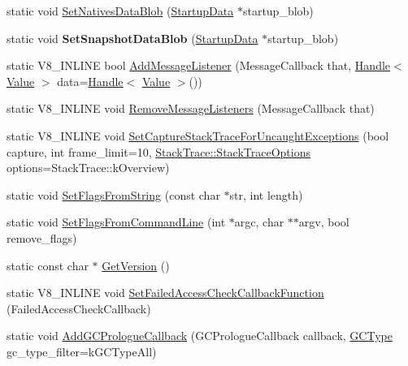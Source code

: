 \begin{DoxyCompactItemize}
\item 
static void \hyperlink{classv8_1_1V8_ae6a0f605e072e9e27e3666559d5c351f}{Set\+Natives\+Data\+Blob} (\hyperlink{classv8_1_1StartupData}{Startup\+Data} $\ast$startup\+\_\+blob)
\item 
\hypertarget{classv8_1_1V8_a231b3cd8e5578497ee36210c0411f14c}{}static void {\bfseries Set\+Snapshot\+Data\+Blob} (\hyperlink{classv8_1_1StartupData}{Startup\+Data} $\ast$startup\+\_\+blob)\label{classv8_1_1V8_a231b3cd8e5578497ee36210c0411f14c}

\item 
static V8\+\_\+\+I\+N\+L\+I\+N\+E bool \hyperlink{classv8_1_1V8_a4e8ca19596400bd4df6a345f66daf937}{Add\+Message\+Listener} (Message\+Callback that, \hyperlink{classv8_1_1Handle}{Handle}$<$ \hyperlink{classv8_1_1Value}{Value} $>$ data=\hyperlink{classv8_1_1Handle}{Handle}$<$ \hyperlink{classv8_1_1Value}{Value} $>$())
\item 
static V8\+\_\+\+I\+N\+L\+I\+N\+E void \hyperlink{classv8_1_1V8_a103099e00d03c714261e00d75f0d745a}{Remove\+Message\+Listeners} (Message\+Callback that)
\item 
static V8\+\_\+\+I\+N\+L\+I\+N\+E void \hyperlink{classv8_1_1V8_a6ed3c6cd32b8d225013445b145381d34}{Set\+Capture\+Stack\+Trace\+For\+Uncaught\+Exceptions} (bool capture, int frame\+\_\+limit=10, \hyperlink{classv8_1_1StackTrace_a9704e4a37949eb8eb8ccddbddf161492}{Stack\+Trace\+::\+Stack\+Trace\+Options} options=Stack\+Trace\+::k\+Overview)
\item 
static void \hyperlink{classv8_1_1V8_ab263a85e6f97ea79d944bd20bb09a95f}{Set\+Flags\+From\+String} (const char $\ast$str, int length)
\item 
static void \hyperlink{classv8_1_1V8_a63157ad9284ffad1c0ab62b21aadd08c}{Set\+Flags\+From\+Command\+Line} (int $\ast$argc, char $\ast$$\ast$argv, bool remove\+\_\+flags)
\item 
static const char $\ast$ \hyperlink{classv8_1_1V8_afcecc0e9e8b5fa17a06a93f7b5a7538d}{Get\+Version} ()
\item 
static V8\+\_\+\+I\+N\+L\+I\+N\+E void \hyperlink{classv8_1_1V8_affcb65e1fdf849fadc6302655b981bbc}{Set\+Failed\+Access\+Check\+Callback\+Function} (Failed\+Access\+Check\+Callback)
\item 
static void \hyperlink{classv8_1_1V8_a49c016f17c67f700387f801b2b29b5ab}{Add\+G\+C\+Prologue\+Callback} (G\+C\+Prologue\+Callback callback, \hyperlink{namespacev8_ac109d6f27e0c0f9ef4e98bcf7a806cf2}{G\+C\+Type} gc\+\_\+type\+\_\+filter=k\+G\+C\+Type\+All)
\item 
$$
\end{DoxyCompactItemize}
